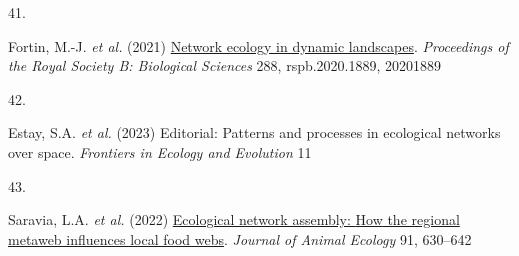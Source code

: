 \documentclass[
]{article}
\newlength{\cslhangindent}
\newlength{\csllabelwidth}
\newenvironment{CSLReferences}[2] %
 {\begin{list}{}{%
  \setlength{\itemindent}{0pt}
  \setlength{\leftmargin}{0pt}
  \setlength{\parsep}{0pt}
  \ifodd #1
   \setlength{\leftmargin}{\cslhangindent}
   \setlength{\itemindent}{-1\cslhangindent}
  \fi
  \setlength{\itemsep}{#2\baselineskip}}}
 {\end{list}}
\newcommand{\CSLLeftMargin}[1]{\parbox[t]{\csllabelwidth}{\strut#1\strut}}
\newcommand{\CSLRightInline}[1]{\parbox[t]{\linewidth - \csllabelwidth}{\strut#1\strut}}
\begin{document}
\begin{CSLReferences}{0}{0}
\CSLLeftMargin{41. }%
\CSLRightInline{Fortin, M.-J. \emph{et al.} (2021)
\href{https://doi.org/10.1098/rspb.2020.1889}{Network ecology in dynamic
landscapes}. \emph{Proceedings of the Royal Society B: Biological
Sciences} 288, rspb.2020.1889, 20201889}

\CSLLeftMargin{42. }%
\CSLRightInline{Estay, S.A. \emph{et al.} (2023) Editorial: {Patterns}
and processes in ecological networks over space. \emph{Frontiers in
Ecology and Evolution} 11}

\CSLLeftMargin{43. }%
\CSLRightInline{Saravia, L.A. \emph{et al.} (2022)
\href{https://doi.org/10.1111/1365-2656.13652}{Ecological network
assembly: {How} the regional metaweb influences local food webs}.
\emph{Journal of Animal Ecology} 91, 630--642}

\end{CSLReferences}
\end{document}
